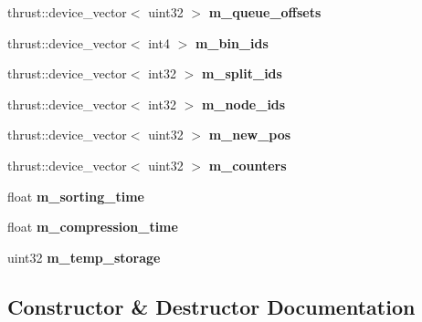 \begin{DoxyCompactItemize}
thrust\+::device\+\_\+vector$<$ uint32 $>$ {\bfseries m\+\_\+queue\+\_\+offsets}
\item 
\mbox{\label{structnih_1_1cuda_1_1_sah__builder_abcfa704a67cea3422b016515a7907df3}} 
thrust\+::device\+\_\+vector$<$ int4 $>$ {\bfseries m\+\_\+bin\+\_\+ids}
\item 
\mbox{\label{structnih_1_1cuda_1_1_sah__builder_ab42d17b6a5a6a9335e7c3a2b8b15b5f2}} 
thrust\+::device\+\_\+vector$<$ int32 $>$ {\bfseries m\+\_\+split\+\_\+ids}
\item 
\mbox{\label{structnih_1_1cuda_1_1_sah__builder_a17da7a61ef5410faf784669ed4c37084}} 
thrust\+::device\+\_\+vector$<$ int32 $>$ {\bfseries m\+\_\+node\+\_\+ids}
\item 
\mbox{\label{structnih_1_1cuda_1_1_sah__builder_a58320098ffc08a6537e730fc6f23ab72}} 
thrust\+::device\+\_\+vector$<$ uint32 $>$ {\bfseries m\+\_\+new\+\_\+pos}
\item 
\mbox{\label{structnih_1_1cuda_1_1_sah__builder_a197d1e335b6daa417b48e9b5f6952ee0}} 
thrust\+::device\+\_\+vector$<$ uint32 $>$ {\bfseries m\+\_\+counters}
\item 
\mbox{\label{structnih_1_1cuda_1_1_sah__builder_a3221090dde8d9d7171fde754df748cc1}} 
float {\bfseries m\+\_\+sorting\+\_\+time}
\item 
\mbox{\label{structnih_1_1cuda_1_1_sah__builder_a313b20383cdf28eb445f14a1ee354e17}} 
float {\bfseries m\+\_\+compression\+\_\+time}
\item 
\mbox{\label{structnih_1_1cuda_1_1_sah__builder_a45d46d556fb94208229a1e8fa3e74bb5}} 
uint32 {\bfseries m\+\_\+temp\+\_\+storage}
\end{DoxyCompactItemize}


\subsection{Constructor \& Destructor Documentation}
\mbox{\label{structnih_1_1cuda_1_1_sah__builder_a90fd3637d56da31fcb25f5acae69e12f}} 
